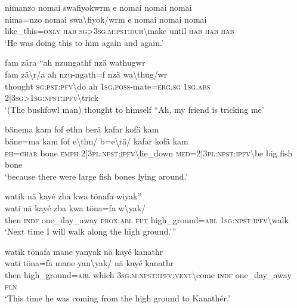 \ea\label{ex:3:a7555}
nimanzo nomai swafiyokwrm e nomai nomai nomai\\
\gll nima=nzo	nomai	swa{\textbackslash}fiyok/wrm	e	nomai	nomai	nomai\\
     like\_this=\textsc{only}	\textsc{hab}	\textsc{sg}>3\textsc{sg}.\textsc{m}:\textsc{pst}:\textsc{dur}{\textbackslash}make	until	\textsc{hab}	\textsc{hab}	\textsc{hab}\\
\glt `He was doing this to him again and again.'
\z

\ea\label{ex:3:a7556}
fam zära ``ah nzungathf nzä wathugwr\\
\gll fam	zä{\textbackslash}r/a	ah	nzu-ngath=f	nzä	wa{\textbackslash}thug/wr\\
     thought	\textsc{sg}:\textsc{pst}:\textsc{pfv}{\textbackslash}do	ah	1\textsc{sg}.\textsc{poss}-mate=\textsc{erg}.\textsc{sg}	1\textsc{sg}.\textsc{abs}	2|3\textsc{sg}>1\textsc{sg}:\textsc{npst}:\textsc{ipfv}{\textbackslash}trick\\
\glt `(The bushfowl man) thought to himself ``Ah, my friend is tricking me'
\z

\ea\label{ex:3:a7558}
bänema kam fof ethn berä kafar kofä kam\\
\gll bäne=ma	kam	fof	e{\textbackslash}thn/	b=e{\textbackslash}rä/	kafar	kofä	kam\\
     \textsc{ph}=\textsc{char}	bone	\textsc{emph}	2|3\textsc{pl}:\textsc{npst}:\textsc{ipfv}{\textbackslash}lie\_down	\textsc{med}=2|3\textsc{pl}:\textsc{npst}:\textsc{ipfv}{\textbackslash}be	big	fish	bone\\
\glt `because there were large fish bones lying around.'
\z

\ea\label{ex:3:a7560}
watik nä kayé zba kwa tönafa wiyak''\\
\gll wati	nä	kayé	zba	kwa	töna=fa	w{\textbackslash}yak/\\
     then	\textsc{indf}	one\_day\_away	\textsc{prox}:\textsc{abl}	\textsc{fut}	high\_ground=\textsc{abl}	1\textsc{sg}:\textsc{npst}:\textsc{ipfv}{\textbackslash}walk\\
\glt `Next time I will walk along the high ground.'''
\z

\ea\label{ex:3:a7561}
watik tönafa mane yanyak nä kayé kanathr\\
\gll wati	töna=fa	mane	yan{\textbackslash}yak/	nä	kayé	kanathr\\
     then	high\_ground=\textsc{abl}	which	3\textsc{sg}.\textsc{m}:\textsc{npst}:\textsc{ipfv}:\textsc{vent}{\textbackslash}come	\textsc{indf}	one\_day\_away	\textsc{pln}\\
\glt `This time he was coming from the high ground to Kanathér.'
\z

